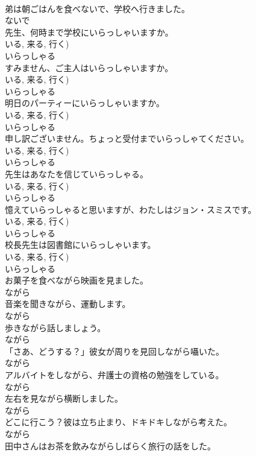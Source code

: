 \documentclass[8pt]{extreport}
\begin{document}
\begin{CJK}{UTF8}{min}
\\	弟は朝ごはんを食べないで、学校へ行きました。	
\\	ないで
\\	先生、何時まで学校にいらっしゃいますか。	
\\	いる, 来る, 行く)	
\\	いらっしゃる
\\	すみません、ご主人はいらっしゃいますか。	
\\	いる, 来る, 行く)	
\\	いらっしゃる
\\	明日のパーティーにいらっしゃいますか。	
\\	いる, 来る, 行く)	
\\	いらっしゃる
\\	申し訳ございません。ちょっと受付までいらっしゃてください。	
\\	いる, 来る, 行く)	
\\	いらっしゃる
\\	先生はあなたを信じていらっしゃる。	
\\	いる, 来る, 行く)	
\\	いらっしゃる
\\	憶えていらっしゃると思いますが、わたしはジョン・スミスです。	
\\	いる, 来る, 行く)	
\\	いらっしゃる
\\	校長先生は図書館にいらっしゃいます。	
\\	いる, 来る, 行く)	
\\	いらっしゃる
\\	お菓子を食べながら映画を見ました。	
\\	ながら
\\	音楽を聞きながら、運動します。	
\\	ながら
\\	歩きながら話しましょう。	
\\	ながら
\\	「さあ、どうする？」彼女が周りを見回しながら囁いた。	
\\	ながら
\\	アルバイトをしながら、弁護士の資格の勉強をしている。	
\\	ながら
\\	左右を見ながら横断しました。	
\\	ながら
\\	どこに行こう？彼は立ち止まり、ドキドキしながら考えた。	
\\	ながら
\\	田中さんはお茶を飲みながらしばらく旅行の話をした。	

\end{CJK}
\end{document}
